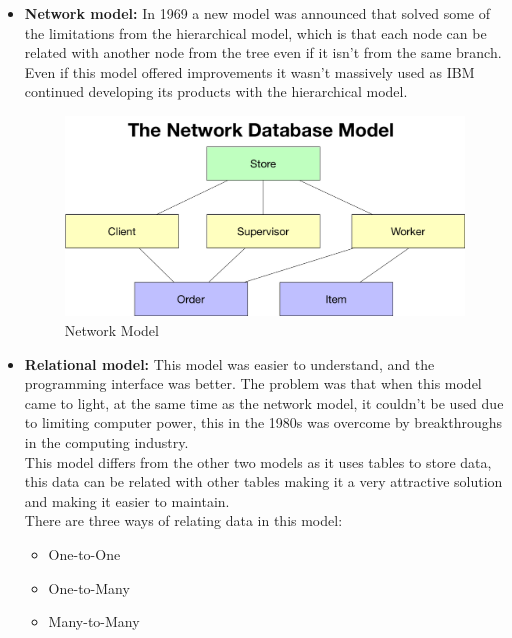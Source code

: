 \begin{itemize}
	\item {\textbf{Network model:} In 1969 a new model was announced that solved some of the limitations from the hierarchical model, which is that each node can be related with another node from the tree even if it isn’t from the same branch. Even if this model offered improvements it wasn’t massively used as IBM continued developing its products with the hierarchical model.
	\begin{center}
		\begin{figure}[h!]
			\centering
			\includegraphics[scale=0.4]{./images/3-network-model}
			\caption{Network Model}
			\label{net_model}
		\end{figure}
	\end{center}
	}
	\item {\textbf{Relational model:} This model was easier to understand, and the programming interface was better. The problem was that when this model came to light, at the same time as the network model, it couldn’t be used due to limiting computer power, this in the 1980s was overcome by breakthroughs in the computing industry.\\
	This model differs from the other two models as it uses tables to store data, this data can be related with other tables making it a very attractive solution and making it easier to maintain.\\
	There are three ways of relating data in this model:
	\begin{itemize}
		\item {One-to-One}
		\item {One-to-Many}
		\item {Many-to-Many}
	\end{itemize}
	\begin{center}
		\begin{figure}[h!]
			\centering

\end{figure}
\end{center}}
\end{itemize}
